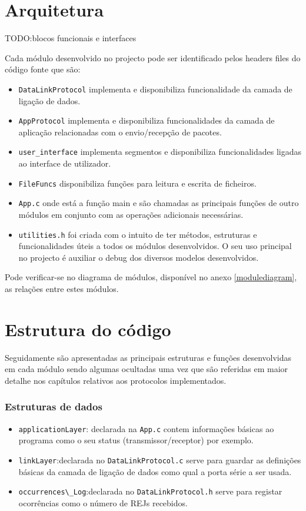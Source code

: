 \documentclass[11pt,a4paper,reqno]{report}
\numberwithin{equation}{section}
\begin{document}
	
\chapter{Arquitetura}

TODO:blocos funcionais e interfaces

Cada módulo desenvolvido no projecto pode ser identificado pelos headers files do código fonte que são:
\begin{itemize}
\item \verb|DataLinkProtocol| implementa e disponibiliza funcionalidade da camada de ligação de dados. 
\item \verb|AppProtocol|  implementa e disponibiliza funcionalidades da camada de aplicação relacionadas com o envio/recepção de pacotes.
\item \verb|user_interface| implementa segmentos e disponibiliza funcionalidades ligadas ao interface de utilizador. 
\item \verb|FileFuncs| disponibiliza funções para leitura e escrita de ficheiros. 
\item \verb|App.c| onde está a função main e são chamadas as principais funções de outro módulos em conjunto com as operações adicionais necessárias. 
\item \verb|utilities.h| foi criada com o intuito de ter métodos, estruturas e funcionalidades úteis a todos os módulos desenvolvidos. O seu uso principal no projecto é auxiliar o debug dos diversos modelos desenvolvidos.
\end{itemize}
Pode verificar-se no diagrama de módulos, disponível no anexo \ref{modulediagram}, as relações entre estes módulos.

\chapter{Estrutura do código}

Seguidamente são apresentadas as principais estruturas e funções desenvolvidas em cada módulo sendo algumas ocultadas uma vez que são referidas em maior detalhe nos capítulos relativos aos protocolos implementados.

\subsection{Estruturas de dados}
\begin{itemize}
\item \verb|applicationLayer|: declarada na \verb|App.c| contem informações básicas ao programa como o seu status (transmissor/receptor) por exemplo. 	
\item \verb|linkLayer|:declarada no \verb|DataLinkProtocol.c| serve para guardar as definições básicas da camada de ligação de dados como qual a porta série a ser usada.	
\item \verb|occurrences\_Log|:declarada no \verb|DataLinkProtocol.h| serve para registar ocorrências como o número de REJs recebidos.	
\end{itemize}
\end{document}
